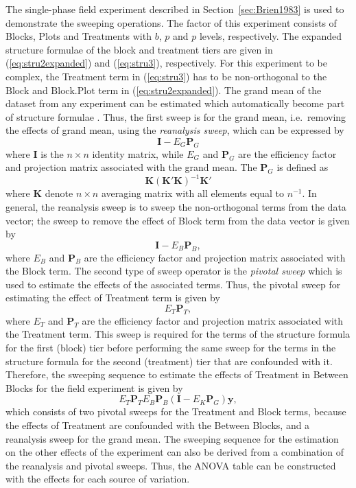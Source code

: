 \documentclass[11pt,a4paper]{article}
\newcommand{\mP}{\mathbf{P}}
\newcommand{\I}{\mathbf{I}}
\newcommand{\K}{\mathbf{K}}
\begin{document}
The single-phase field experiment described in Section~\ref{sec:Brien1983} is used to demonstrate the sweeping operations. The factor of this experiment consists of Blocks, Plots and Treatments with $b$, $p$ and $p$ levels, respectively. The expanded structure formulae of the block and treatment tiers are given in (\ref{eq:stru2expanded}) and (\ref{eq:stru3}), respectively. For this experiment to be complex, the Treatment term in (\ref{eq:stru3}) has to be non-orthogonal to the $\mathrm{Block}$ and $\mathrm{Block.Plot}$ term in (\ref{eq:stru2expanded}). The grand mean of the dataset from any experiment can be estimated which automatically become part of structure formulae \citep{Payne1977}. Thus, the first sweep is for the grand mean, i.e.\ removing the effects of grand mean, using the \emph{reanalysis sweep}, which can be expressed by 
\begin{equation}
\mathbf{I} - E_{G} \mP_{G}
\end{equation}
where $\mathbf{I}$ is the $n \times n$ identity matrix, while $E_{G}$ and $\mP_{G}$ are the efficiency factor and projection matrix associated with the grand mean. The $\mP_{G}$ is defined as 
\[ {\K}({\K}'{\K})^{-1}{\K}'\]
where $\K$ denote $n \times n$ averaging matrix with all elements equal to ${n}^{-1}$. In general, the reanalysis sweep is to sweep the non-orthogonal terms from the data vector; the sweep to remove the effect of Block term from the data vector is given by  
\[\mathbf{I} - E_B \mathbf{P}_B,\]
where $E_{B}$ and $\mP_{B}$ are the efficiency factor and projection matrix associated with the Block term. The second type of sweep operator is the \emph{pivotal sweep} which is used to estimate the effects of the associated terms. Thus, the pivotal sweep for estimating the effect of Treatment term is given by  
\begin{equation}
E_T \mathbf{P}_T,
\end{equation}
where $E_{T}$ and $\mP_{T}$ are the efficiency factor and projection matrix associated with the Treatment term. This sweep is required for the terms of the structure formula for the first (block) tier before performing the same sweep for the terms in the structure formula for the second (treatment) tier that are confounded with it. Therefore, the sweeping sequence to estimate the effects of Treatment in Between Blocks for the field experiment is given by 
\[E_T \mP_T E_B \mP_B (\I - E_K \mP_G)\bm{y},\] 
which consists of two pivotal sweeps for the Treatment and Block terms, because the effects of Treatment are confounded with the Between Blocks, and a reanalysis sweep for the grand mean. The sweeping sequence for the estimation on the other effects of the experiment can also be derived from a combination of the reanalysis and pivotal sweeps. Thus, the ANOVA table can be constructed with the effects for each source of variation. 
\end{document}
